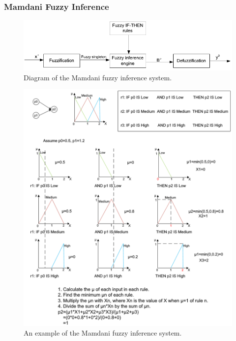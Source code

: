 \documentclass[journal,a4paper,onecolumn]{article}
\begin{document}
\subsubsection{Mamdani Fuzzy Inference}
\begin{figure}[!hbt]
	\begin{center}
		\includegraphics[width=\columnwidth]{fig48}
		\caption{Diagram of the Mamdani fuzzy inference system.}
		\label{fig:diagram-Mamdani}
	\end{center}
\end{figure}

\begin{figure}[!hbt]
	\begin{center}
		\includegraphics[width=\columnwidth]{fuzzy_logic_example}
		\caption{An example of the Mamdani fuzzy inference system.}
		\label{fig:example -Mamdani}
	\end{center}
\end{figure}
\end{document}
